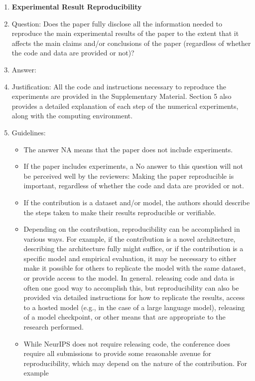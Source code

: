 \documentclass{article}
\begin{document}
\begin{enumerate}
    \item {\bf Experimental Result Reproducibility}
    \item[] Question: Does the paper fully disclose all the information needed to reproduce the main experimental results of the paper to the extent that it affects the main claims and/or conclusions of the paper (regardless of whether the code and data are provided or not)?
    \item[] Answer: \answerYes{} %
    \item[] Justification: 
    All the code and instructions necessary to reproduce the experiments are provided in the Supplementary Material. Section 5 also provides a detailed explanation of each step of the numerical experiments, along with the computing environment.
    \item[] Guidelines:
    \begin{itemize}
        \item The answer NA means that the paper does not include experiments.
        \item If the paper includes experiments, a No answer to this question will not be perceived well by the reviewers: Making the paper reproducible is important, regardless of whether the code and data are provided or not.
        \item If the contribution is a dataset and/or model, the authors should describe the steps taken to make their results reproducible or verifiable.
        \item Depending on the contribution, reproducibility can be accomplished in various ways. For example, if the contribution is a novel architecture, describing the architecture fully might suffice, or if the contribution is a specific model and empirical evaluation, it may be necessary to either make it possible for others to replicate the model with the same dataset, or provide access to the model. In general. releasing code and data is often one good way to accomplish this, but reproducibility can also be provided via detailed instructions for how to replicate the results, access to a hosted model (e.g., in the case of a large language model), releasing of a model checkpoint, or other means that are appropriate to the research performed.
        \item While NeurIPS does not require releasing code, the conference does require all submissions to provide some reasonable avenue for reproducibility, which may depend on the nature of the contribution. For example
        \begin{enumerate}

\end{enumerate}
\end{itemize}
\end{enumerate}
\end{document}
